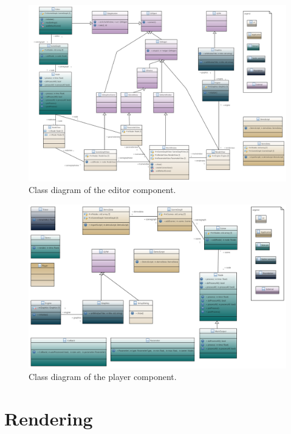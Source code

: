 \documentclass[%
    a4paper,    %
    justified,  %
    nobib,      %
    openany     %
]{tufte-book}
\begin{document}
\begin{figure}[h]
  \caption{Class diagram of the editor component.}
  \label{fig:editor-class-diagram}
  \includegraphics[width=0.95\linewidth]{images/editor-class-diagram}
\end{figure}

\begin{figure}[h]
  \caption{Class diagram of the player component.}
  \label{fig:player-class-diagram}
  \includegraphics[width=0.95\linewidth]{images/player-class-diagram}
\end{figure}


\section{Rendering}
\label{sec:rendering}
\end{document}
